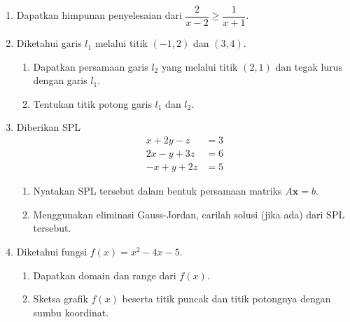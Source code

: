 \documentclass[10pt,openany,a4paper]{article}
\theoremstyle{definition}
\theoremstyle{definition}
\theoremstyle{plain}
\begin{document}
\newpage

\begin{enumerate}
    \item Dapatkan himpunan penyelesaian dari $\dfrac{2}{x-2}\geq\dfrac{1}{x+1}$.

    \item Diketahui garis $l_1$ melalui titik $(-1,2)$ dan $(3,4)$.
    \begin{enumerate}
        \item Dapatkan persamaan garis $l_2$ yang melalui titik $(2,1)$ dan tegak lurus dengan garis $l_1$.
        \item Tentukan titik potong garis $l_1$ dan $l_2$.
    \end{enumerate}

    \item Diberikan SPL
    \begin{align*}
        x+2y-z &= 3\\
        2x-y+3z &= 6\\
        -x+y+2z &= 5
    \end{align*}
    \begin{enumerate}
        \item Nyatakan SPL tersebut dalam bentuk persamaan matriks $A\mathbf{x}=b$.
        \item Menggunakan eliminasi Gauss-Jordan, carilah solusi (jika ada) dari SPL tersebut.
    \end{enumerate}

    \item Diketahui fungsi $f(x)=x^2-4x-5$.
    \begin{enumerate}
        \item Dapatkan domain dan range dari $f(x)$.
        \item Sketsa grafik $f(x)$ beserta titik puncak dan titik potongnya dengan sumbu koordinat.
    \end{enumerate}


\end{enumerate}
\end{document}
